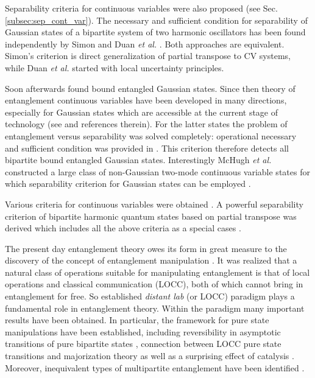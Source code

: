 \documentclass[twocolumn,aps,rmp]{revtex4}
\begin{document}
Separability criteria for continuous variables were also proposed (see
Sec. \ref{subsec:sep_cont_var}). The necessary and sufficient
condition for separability of Gaussian states of a bipartite system of
two harmonic oscillators has been found independently by Simon and Duan \emph{et al.}
\cite{Simon,DuanGCZ1999-criterion}.
 Both approaches are equivalent. Simon's
criterion is direct generalization of partial transpose to CV systems,
while Duan \emph{et al.} started with local uncertainty principles.

Soon afterwards \cite {WernerWolf} found bound entangled Gaussian
states. Since then theory of entanglement continuous variables have
been developed in many directions, especially for Gaussian states
which are accessible at the current stage of technology (see
\cite{BraunsteinP} and references therein). For the latter states the
problem of entanglement versus separability was solved completely:
operational necessary and sufficient condition was provided in
\cite{GaussianAlgorithm}. This criterion therefore detects all
bipartite bound entangled Gaussian states. Interestingly McHugh \emph{et al.} constructed
a large class of non-Gaussian two-mode continuous variable states for which separability criterion for Gaussian states can be employed \cite {McHughBZ2007}.


Various criteria for continuous variables were obtained \cite
{ManciniGVT2001-criterion,RaymerFSG-cont-var,AgarwalB-cont-var,HilleryZ-cont-var}.
A powerful separability criterion of bipartite harmonic quantum states
based on partial transpose was derived which includes all the above
criteria as a special cases \cite {ShchukinW, MiranowiczP}.

The present day entanglement theory owes its form in great measure to
the discovery of the concept of entanglement manipulation
\cite{Popescu2,BBPSSW1996}. It was realized \cite{BBPSSW1996} that a
natural class of operations suitable for manipulating entanglement is
that of local operations and classical communication (LOCC), both of
which cannot bring in entanglement for free. So established {\it
  distant lab} (or LOCC) paradigm plays a fundamental role in
entanglement theory. Within the paradigm many important results have
been obtained. In particular, the framework for pure state
manipulations have been established, including reversibility in
asymptotic transitions of pure bipartite states \cite{BBPS1996},
connection between LOCC pure state transitions and majorization theory
\cite{SchumacherN-1996-pra} as well as a surprising effect of catalysis
\cite{JonathanP,VidalC,VidalC-irre}. Moreover, inequivalent types of
multipartite entanglement have been identified
\cite{DurVC00-wstate,BPRST-mregs}.
\end{document}
